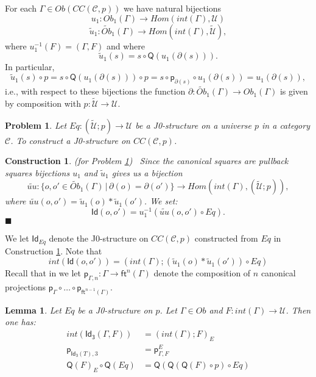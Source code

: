 \documentclass[12pt]{article}
\numberwithin{equation}{section}
\newenvironment{eq}{\begin{equation}}{\end{equation}}
\newtheorem{lemma}[proposition]{Lemma}
\newtheorem{problem}[proposition]{Problem}
\newtheorem{construction0}[proposition]{Construction}
\newenvironment{construction}[1]{\begin{construction0}(for Problem \ref{#1})\ }{$\blacksquare$ \end{construction0}}
\newcommand{\llabel}[1]{\label{#1}}
\newcommand{\sr}{\rightarrow}
\newcommand{\wt}{\widetilde}
\newcommand{\toCC}{CC} %
\newcommand{\C}{{\mathcal C}}  %
\newcommand{\ft}{\mathsf{ft}}
\newcommand{\p}{\mathsf{p}}
\newcommand{\Id}{\mathsf{Id}} %
\newcommand{\Idx}{\mathsf{Id_3}} %
\newcommand{\U}{\mathcal{U}}
\newcommand{\Q}{\mathsf{Q}}
\newcommand{\Obwt}{\wt{Ob}}
\begin{document}
For each $\Gamma\in Ob(\toCC({\C},p))$ we have natural bijections
%
\begin{eq}
\llabel{2015.03.27.eq7b} u_1:Ob_1(\Gamma)\sr Hom(int(\Gamma),\U)
\end{eq}%
%
\begin{eq}
\llabel{2015.03.27.eq7a} \wt{u}_1:\Obwt_1(\Gamma)\sr Hom(int(\Gamma),\wt{\U}),
\end{eq}%
%
where $u_1^{-1}(F)=(\Gamma,F)$ and where
%
\begin{eq}
\llabel{2015.03.31.eq5} \wt{u}_1(s)=s\circ \Q(u_1(\partial(s))).
\end{eq}%
%
In particular,
%
$$\wt{u}_1(s)\circ p=s\circ \Q(u_1(\partial(s)))\circ p=s\circ
\p_{\partial(s)}\circ u_1(\partial(s))=u_1(\partial(s)),$$
%
i.e., with respect to these bijections the function
$\partial:\Obwt_1(\Gamma)\sr Ob_1(\Gamma)$ is given by composition with
$p:\wt{\U}\sr \U$.
%
\begin{problem}
\llabel{2015.03.27.prob3} Let $Eq:(\wt{\U};p)\sr \U$ be a J0-structure on a
universe $p$ in a category $\C$. To construct a J0-structure on
$\toCC({\C},p)$.
\end{problem}
%
\begin{construction}{2015.03.27.prob3}\rm
\llabel{2015.03.27.constr3} Since the canonical squares are pullback squares
bijections $u_1$ and $\wt{u}_1$ gives us a bijection
%
$$\wt{uu}:\{o,o'\in\Obwt_1(\Gamma)\,|\,\partial(o)=\partial(o')\} \sr
Hom(int(\Gamma),(\wt{\U};p)),$$
%
where $\wt{uu}(o,o')=\wt{u}_1(o)*\wt{u}_1(o')$. We set:
%
$$\Id(o,o')=u_1^{-1}(\wt{uu}(o,o')\circ Eq).$$
%
\end{construction}
%
We let $\Id_{Eq}$ denote the J0-structure on $\toCC({\C},p)$ constructed
from $Eq$ in Construction \ref{2015.03.27.constr3}. Note that
%
\begin{eq}
\llabel{2015.03.31.eq1}
int(\Id(o,o'))=(int(\Gamma);(\wt{u}_1(o)*\wt{u}_1(o'))\circ Eq)
\end{eq}%
%
Recall that in \cite{Csubsystems} we let $\p_{\Gamma,n}:\Gamma\sr \ft^n(\Gamma)$
denote the composition of $n$ canonical projections $\p_{\Gamma}\circ \dots\circ
\p_{\ft^{n-1}(\Gamma)}$.
%
\begin{lemma}
\llabel{2015.03.27.l1} Let $Eq$ be a J0-structure on $p$. Let $\Gamma\in Ob$
and $F:int(\Gamma)\sr \U$. Then one has:
%
\begin{align*}
  int(\Idx(\Gamma,F))&=(int(\Gamma);F)_{E} \\
  \p_{\Idx(T),3} &= \p^E_{\Gamma,F} \\
  \Q(F)_{E}\circ \Q(Eq)&=\Q(\Q(\Q(F)\circ p)\circ Eq)
\end{align*}
%
%
\end{lemma}
\end{document}
